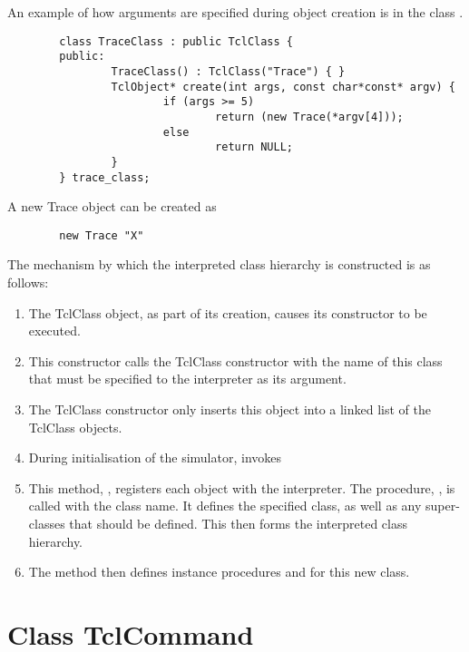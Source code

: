 \documentclass{article}
\begin{document}
An example of how arguments are specified during object creation is in the
class .
\begin{verbatim}
        class TraceClass : public TclClass {
        public:
                TraceClass() : TclClass("Trace") { }
                TclObject* create(int args, const char*const* argv) {
                        if (args >= 5)
                                return (new Trace(*argv[4]));
                        else
                                return NULL;
                }
        } trace_class;
\end{verbatim}
A new Trace object can be created as
\begin{verbatim}
        new Trace "X"
\end{verbatim}

\danger
The mechanism by which the interpreted class hierarchy is constructed is as
follows:
\closedanger
\begin{enumerate}
\item The TclClass object, as part of its creation, causes its constructor
  to be executed.  
\item This constructor calls the TclClass constructor with the name of this
  class that must be specified to the interpreter as its argument.
\item The TclClass constructor only inserts this object into a linked list
  of the TclClass objects.
\item During initialisation of the simulator,
  invokes 
\item This method, , registers each object with the interpreter.
  The procedure,
  ,
  is called with the class name.
  It defines the specified class, as well as any super-classes
  that should be defined.
  This then forms the interpreted class hierarchy.
\item The  method then defines instance procedures
   and  for this new class.
\end{enumerate}

\section{Class TclCommand}
\label{sec:TclCommand}
\end{document}
